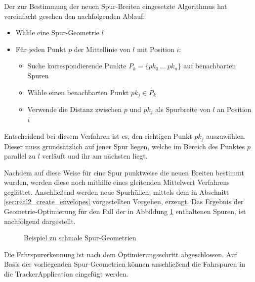 Der zur Bestimmung der neuen Spur-Breiten eingesetzte Algorithmus hat vereinfacht gesehen den nachfolgenden Ablauf:

\begin{itemize}
    \item Wähle eine Spur-Geometrie $l$
    \item Für jeden Punkt $p$ der Mittellinie von $l$ mit Position $i$:
    \begin{itemize}
        \item Suche korrespondierende Punkte $P_k = \{pk_0\ ...\ pk_n\}$ auf benachbarten Spuren
        \item Wähle einen benachbarten Punkt $pk_j \in P_k$
        \item Verwende die Distanz zwischen $p$ und $pk_j$ als Spurbreite von $l$ an Position $i$
    \end{itemize}
\end{itemize}

Entscheidend bei diesem Verfahren ist es, den richtigen Punkt $pk_j$ auszuwählen. Dieser muss grundsätzlich
auf jener Spur liegen, welche im Bereich des Punktes $p$ parallel zu $l$ verläuft und ihr am nächsten liegt.

Nachdem auf diese Weise für eine Spur punktweise die neuen Breiten bestimmt wurden, werden diese noch mithilfe
eines gleitenden Mittelwert Verfahrens geglättet. Anschließend werden neue Spurhüllen, mittels dem in
Abschnitt \ref{sec:real2_create_envelopes} vorgestellten Vorgehen, erzeugt.
Das Ergebnis der Geometrie-Optimierung für den Fall der in Abbildung \ref{fig:real2_pre_opt} enthaltenen Spuren,
ist nachfolgend dargestellt.

\begin{figure}[H]
    \centering
    \caption{Beispiel zu schmale Spur-Geometrien}
    \label{fig:real2_pre_opt}
\end{figure}

Die Fahrspurerkennung ist nach dem Optimierungsschritt abgeschlossen. Auf Basis der vorliegenden
Spur-Geometrien können anschließend die Fahrspuren in die TrackerApplication eingefügt werden.


